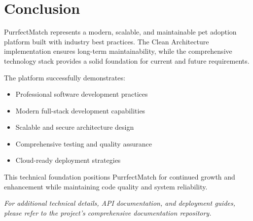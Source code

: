 \documentclass[12pt,a4paper]{article}
\begin{document}
\section{Conclusion}

PurrfectMatch represents a modern, scalable, and maintainable pet adoption platform built with industry best practices. The Clean Architecture implementation ensures long-term maintainability, while the comprehensive technology stack provides a solid foundation for current and future requirements.

The platform successfully demonstrates:
\begin{itemize}
    \item Professional software development practices
    \item Modern full-stack development capabilities
    \item Scalable and secure architecture design
    \item Comprehensive testing and quality assurance
    \item Cloud-ready deployment strategies
\end{itemize}

This technical foundation positions PurrfectMatch for continued growth and enhancement while maintaining code quality and system reliability.

\vspace{1cm}

\begin{center}
\textit{For additional technical details, API documentation, and deployment guides, please refer to the project's comprehensive documentation repository.}
\end{center}
\end{document}

